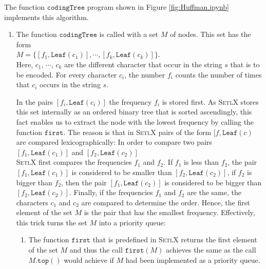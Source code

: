 \noindent
The function $\texttt{codingTree}$ program shown in Figure \ref{fig:Huffman.ipynb} implements this algorithm.
\begin{enumerate}
\item The function $\texttt{codingTree}$ is called with a set  $M$ of nodes.  This set has the form
      \\[0.2cm]
      \hspace*{1.3cm}
      $M = \bigl\{ [ f_1, \texttt{Leaf}(c_1) ], \cdots, [f_k, \texttt{Leaf}(c_k)] \bigr\}$.
      \\[0.2cm]
      Here, $c_1$, $\cdots$, $c_k$ are the different character that occur in the string $s$ that is to be encoded. 
      For every character $c_i$, the number $f_i$ counts the number of times that $c_i$ occurs in the string $s$.

      In the pairs $[f_i, \texttt{Leaf}(c_i)]$ the frequency $f_i$ is stored first.
      As \textsc{SetlX} stores this set internally as an ordered binary tree that is sorted ascendingly, this
      fact enables us to extract the node with the lowest frequency by calling the function $\texttt{first}$.
      The reason is that in \textsc{SetlX} pairs of the form $[f, \texttt{Leaf}(c)$ are compared
      lexicographically:  In order to compare two pairs
      \\[0.2cm]
      \hspace*{1.3cm}
      $[f_1, \texttt{Leaf}(c_1)]$ \quad and \quad $[f_2, \texttt{Leaf}(c_2)]$
      \\[0.2cm]
      \textsc{SetlX} first compares the frequencies $f_1$ and $f_2$.  If $f_1$ is less than $f_2$, the pair
      $[f_1, \texttt{Leaf}(c_1)]$ is considered to be smaller than $[f_2, \texttt{Leaf}(c_2)]$, if $f_2$ is bigger
      than $f_2$, then the pair $[f_1, \texttt{Leaf}(c_2)]$ is considered to be bigger than
      $[f_2,
      \texttt{Leaf}(c_2)]$.  Finally, if the frequencies $f_1$ and $f_2$ are the same, the characters $c_1$ and
      $c_2$ are compared to determine the order.  Hence, the first element of the set $M$ is the pair that has
      the smallest frequency.  Effectively, this trick turns the set $M$ into a priority queue:
      \begin{enumerate}
      \item The function $\texttt{first}$ that is predefined in \textsc{SetlX} returns the first element of the
            set $M$ and thus the call $\texttt{first}(M)$ achieves the same as the call $M.\texttt{top}()$
            would achieve if $M$ had been implemented as a priority queue.

\end{enumerate}
\end{enumerate}
